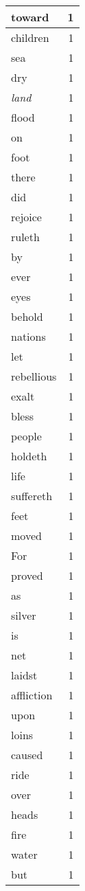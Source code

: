 \begin{center}
\begin{longtable}{l|r}
toward & 1 \\ \hline
children & 1 \\ \hline
sea & 1 \\ \hline
dry & 1 \\ \hline
\emph{land} & 1 \\ \hline
flood & 1 \\ \hline
on & 1 \\ \hline
foot & 1 \\ \hline
there & 1 \\ \hline
did & 1 \\ \hline
rejoice & 1 \\ \hline
ruleth & 1 \\ \hline
by & 1 \\ \hline
ever & 1 \\ \hline
eyes & 1 \\ \hline
behold & 1 \\ \hline
nations & 1 \\ \hline
let & 1 \\ \hline
rebellious & 1 \\ \hline
exalt & 1 \\ \hline
bless & 1 \\ \hline
people & 1 \\ \hline
holdeth & 1 \\ \hline
life & 1 \\ \hline
suffereth & 1 \\ \hline
feet & 1 \\ \hline
moved & 1 \\ \hline
For & 1 \\ \hline
proved & 1 \\ \hline
as & 1 \\ \hline
silver & 1 \\ \hline
is & 1 \\ \hline
net & 1 \\ \hline
laidst & 1 \\ \hline
affliction & 1 \\ \hline
upon & 1 \\ \hline
loins & 1 \\ \hline
caused & 1 \\ \hline
ride & 1 \\ \hline
over & 1 \\ \hline
heads & 1 \\ \hline
fire & 1 \\ \hline
water & 1 \\ \hline
but & 1 \\ \hline

\end{longtable}
\end{center}
